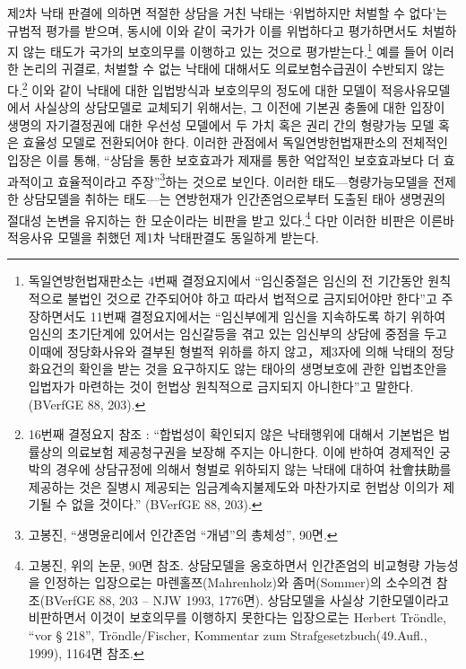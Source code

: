 제2차 낙태 판결에 의하면 적절한 상담을 거친 낙태는 `위법하지만 처벌할 수 없다'는 규범적 평가를 받으며, 동시에 이와 같이 국가가 이를 위법하다고 평가하면서도 처벌하지 않는 태도가 국가의 보호의무를 이행하고 있는 것으로 평가받는다.\footnote{독일연방헌법재판소는 4번째 결정요지에서 ``임신중절은 임신의 전 기간동안 원칙적으로 불법인 것으로 간주되어야 하고 따라서 법적으로 금지되어야만 한다''고 주장하면서도 11번째 결정요지에서는 ``임신부에게 임신을 지속하도록 하기 위하여 임신의 초기단계에 있어서는 임신갈등을 겪고 있는 임신부의 상담에 중점을 두고 이때에 정당화사유와 결부된 형벌적 위하를 하지 않고，제3자에 의해 낙태의 정당화요건의 확인을 받는 것을 요구하지도 않는 태아의 생명보호에 관한 입법초안을 입법자가 마련하는 것이 헌법상 원칙적으로 금지되지 아니한다''고 말한다.(BVerfGE 88, 203).} 예를 들어 이러한 논리의 귀결로, 처벌할 수 없는 낙태에 대해서도 의료보험수급권이 수반되지 않는다.\footnote{16번째 결정요지 참조 : ``합법성이 확인되지 않은 낙태행위에 대해서 기본법은 법률상의 의료보험 제공청구권을 보장해 주지는 아니한다. 이에 반하여 경제적인 궁박의 경우에 상담규정에 의해서 형벌로 위하되지 않는 낙태에 대하여 社會扶助를 제공하는 것은 질병시 제공되는 임금계속지불제도와 마찬가지로 헌법상 이의가 제기될 수 없을 것이다.'' (BVerfGE 88, 203).} 이와 같이 낙태에 대한 입법방식과 보호의무의 정도에 대한 모델이 적응사유모델에서 사실상의 상담모델로 교체되기 위해서는, 그 이전에 기본권 충돌에 대한 입장이 생명의 자기결정권에 대한 우선성 모델에서 두 가치 혹은 권리 간의 형량가능 모델 혹은 효율성 모델로 전환되어야 한다. 이러한 관점에서 독일연방헌법재판소의 전체적인 입장은 이를 통해, ``상담을 통한 보호효과가 제재를 통한 억압적인 보호효과보다 더 효과적이고 효율적이라고 주장''\footnote{고봉진, ``생명윤리에서 인간존엄 ``개념''의 총체성'', 90면.}하는 것으로 보인다. 이러한 태도---형량가능모델을 전제한 상담모델을 취하는 태도---는 연방헌재가 인간존엄으로부터 도출된 태아 생명권의 절대성 논변을 유지하는 한 모순이라는 비판을 받고 있다.\footnote{고봉진, 위의 논문, 90면 참조. 상담모델을 옹호하면서 인간존엄의 비교형량 가능성을 인정하는 입장으로는 마렌홀쯔(Mahrenholz)와 좀머(Sommer)의 소수의견 참조(BVerfGE 88, 203 -- NJW 1993, 1776면). 상담모델을 사실상 기한모델이라고 비판하면서 이것이 보호의무를 이행하지 못한다는 입장으로는 Herbert Tröndle, ``vor § 218'', Tröndle/Fischer, Kommentar zum Strafgesetzbuch(49.Aufl., 1999), 1164면 참조.} 다만 이러한 비판은 이른바 적응사유 모델을 취했던 제1차 낙태판결도 동일하게 받는다.

